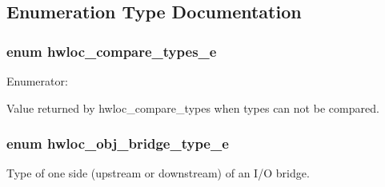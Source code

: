 \subsection{Enumeration Type Documentation}
\hypertarget{a00041_ga46323568968005137c32f6a1cd405b74}{
\subsubsection[{hwloc\_\-compare\_\-types\_\-e}]{\setlength{\rightskip}{0pt plus 5cm}enum {\bf hwloc\_\-compare\_\-types\_\-e}}}
\label{a00041_ga46323568968005137c32f6a1cd405b74}
\begin{Desc}
\item[Enumerator: ]\par
\begin{description}
\item[{\em 
\hypertarget{a00041_gga46323568968005137c32f6a1cd405b74a2f8297ea36eba46e7596e810a67298fb}{
HWLOC\_\-TYPE\_\-UNORDERED}
\label{a00041_gga46323568968005137c32f6a1cd405b74a2f8297ea36eba46e7596e810a67298fb}
}]Value returned by hwloc\_\-compare\_\-types when types can not be compared. \end{description}
\end{Desc}

\hypertarget{a00041_ga48a4803c72574191d7ead1c62aaf9860}{
\subsubsection[{hwloc\_\-obj\_\-bridge\_\-type\_\-e}]{\setlength{\rightskip}{0pt plus 5cm}enum {\bf hwloc\_\-obj\_\-bridge\_\-type\_\-e}}}
\label{a00041_ga48a4803c72574191d7ead1c62aaf9860}


Type of one side (upstream or downstream) of an I/O bridge. 

